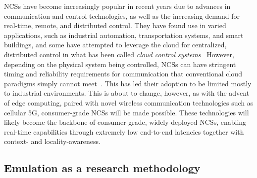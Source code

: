 \glspl{NCS} have become increasingly popular in recent years due to advances in communication and control technologies, as well as the increasing demand for real-time, remote, and distributed control.
They have found use in varied applications, such as industrial automation, transportation systems, and smart buildings, and some have attempted to leverage the cloud for centralized, distributed control in what has been called \emph{cloud control systems}~\cite{xia2015cloud}
However, depending on the physical system being controlled, \glspl{NCS} can have stringent timing and reliability requirements for communication that conventional cloud paradigms simply cannot meet~\cite{wan2020efficient}.
This has led their adoption to be limited mostly to industrial environments.
This is about to change, however, as with the advent of edge computing, paired with novel wireless communication technologies such as cellular 5G, consumer-grade \glspl{NCS} will be made possible.
These technologies will likely become the backbone of consumer-grade, widely-deployed \glspl{NCS}, enabling real-time capabilities through extremely low end-to-end latencies together with context- and locality-awareness.

\subsection{Emulation as a research methodology}
